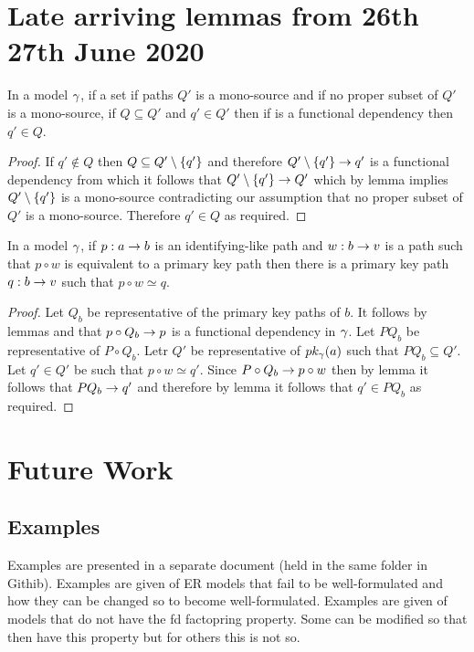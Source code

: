 \section{Late arriving lemmas from 26th 27th June 2020}


\begin{lemma}
In a model $\gamma$, if a set if paths $Q'$ is a mono-source and if no proper subset of $Q'$ is a mono-source, if $Q \subseteq Q'$ and $q' \in Q'$ then
if  is a functional dependency then $q' \in Q$.
\end{lemma}
\begin{proof}
If $q' \notin Q$ then $Q \subseteq Q' \setminus \left\{q'\right\}$ and therefore $Q' \setminus \left\{q'\right\} \rightarrow q'$ is a functional dependency from which it follows that
$Q' \setminus \left\{q'\right\} \rightarrow Q'$
which by lemma  implies $Q' \setminus \left\{q'\right\}$ is a mono-source contradicting our assumption that no proper subset of $Q'$ is a mono-source.
Therefore $q' \in Q$ as required.
\end{proof}

\begin{lemma}
In a model $\gamma$, if $p:a \rightarrow b$ is an identifying-like path and $w:b \rightarrow v$ is a path such that $p \circ w$ is equivalent to a primary key path then
there is a primary key path $q:b \rightarrow v$ such that $p \circ w \simeq q$.
\end{lemma}
\begin{proof}
Let $Q_b$ be representative of the primary key paths of $b$. It follows by lemmas  and  that $p \circ Q_b \rightarrow p$ is a functional dependency in $\gamma$. 
Let $PQ_b$ be representative of $P \circ Q_b$. Letr $Q'$ be representative of $pk_{\gamma}(a)$ such that $PQ_b \subseteq Q'$. Let $q' \in Q'$ be such that $p \circ w \simeq q'$.
Since $P \circ Q_b \rightarrow p\circ w$ then by lemma  it follows that $PQ_b \rightarrow q'$ and therefore   
by lemma   it follows that $q' \in PQ_b$ as required.
\end{proof}

\newpage
\section{Future Work}

\subsection{Examples}
Examples are presented in a separate document (held in the same folder in Githib). Examples are given of ER models that fail to be well-formulated and how they can be changed so to become well-formulated.  Examples are given of models that do not have the fd factopring property. Some can be modified 
so that then have this property but for others this is not so. 
